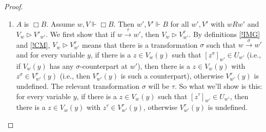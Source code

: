 \documentclass[11pt]{woarticle}
\newcommand{\cmnt}[1]{\iffalse #1 \fi}
\theoremstyle{break}
\theoremstyle{nonumberplain}
\newcommand{\SAT}{\Vdash}
\newcommand{\Img}{\triangleright}
\newcommand{\1}{\;\,|\;\,}
\begin{document}
\begin{proof}
\begin{enumerate}
{    }

  \item $A$ is $\Box B$.\; Assume $w,V \SAT \Box B$. Then $w',V' \SAT
    B$ for all $w',V'$ with $wRw'$ and $V_w \Img V'_{w'}$. We first
    show that if $w\xrightarrow{\tau}w'$, then $V_w \Img
    V^\tau_{w'}$. %
    \cmnt{%
      Recall that by definition \ref{!IMG}, $V_w \Img V^\tau_{w'}$ if
      there is a counterpart relation between $w$ and $w'$ such that
      for every variable $x$, if $V_w(x)$ has a counterpart at
      $w'$, then $V^\tau_{w'}(x)$ is one of these counterparts,
      otherwise it is undefined. Moreover, by definition \ref{!CM},
      every $\tau$ with $w\xrightarrow{\tau}w'$ determines a
      counterpart relation that holds between $V_w(x)$ at $w$ and $d'
      \in U_{w'}$ at $w'$ iff there is a variable $z$ with $z\in
      V_w(x)$ and $z^\tau \in d'$. Taken together, $V_w \Img
      V^\tau_{w'}$ iff there is a transformation $\sigma$ such that
      $w\xrightarrow{\sigma}w'$ and for every variable $x$, if there
      is a $z \in V_w(x)$ such that $[z^\sigma]_{w'} \in U_{w'}$, then
      there is a $z \in V_w(x)$ such that $z^\sigma_{w'} \in
      V^\tau_{w'}(x)$.%
    } %
    By definitions \ref{!IMG} and \ref{!CM}, $V_w \Img V^\tau_{w'}$
    means that there is a transformation $\sigma$ such that
    $w\xrightarrow{\sigma}w'$ and for every variable $y$, if there is
    a $z \in V_w(y)$ such that $[z^\sigma]_{w'} \in U_{w'}$ (i.e., if
    $V_w(y)$ has any $\sigma$-counterpart at $w'$), then there is a $z
    \in V_w(y)$ with $z^\sigma \in V^\tau_{w'}(y)$ (i.e., then
    $V^\tau_{w'}(y)$ is such a counterpart), otherwise
    $V^\tau_{w'}(y)$ is undefined. The relevant transformation
    $\sigma$ will be $\tau$. So what we'll show is this: for every
    variable $y$, if there is a $z \in V_w(y)$ such that
    $[z^\tau]_{w'} \in U_{w'}$, then there is a $z \in V_w(y)$ with
    $z^\tau \in V^\tau_{w'}(y)$, otherwise
    $V^\tau_{w'}(y)$ is undefined. 


\end{enumerate}
\end{proof}
\end{document}
